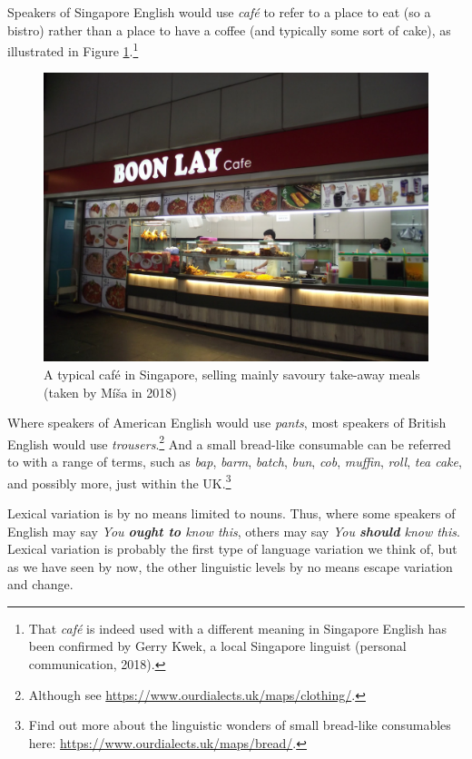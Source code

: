 Speakers of Singapore English would use \emph{café} to refer to a place to eat (so a bistro) rather than a place to have a coffee (and typically some sort of cake), as illustrated in Figure \ref{fig:boonlaycafe}.\footnote{That \emph{café} is indeed used with a different meaning in Singapore English has been confirmed by Gerry Kwek, a local Singapore linguist (personal communication, 2018).}

\begin{figure}[H]
    \centering
    \includegraphics[scale=0.2]{chapters/img/boonlaycafe.png}
    \caption{A typical café in Singapore, selling mainly savoury take-away meals (taken by Míša in 2018)}
    \label{fig:boonlaycafe}
\end{figure}

\noindent Where speakers of American English would use \emph{pants}, most speakers of British English would use \emph{trousers}.\footnote{Although see \url{https://www.ourdialects.uk/maps/clothing/}.} And a small bread-like consumable can be referred to with a range of terms, such as \emph{bap}, \emph{barm}, \emph{batch}, \emph{bun}, \emph{cob}, \emph{muffin}, \emph{roll}, \emph{tea cake}, and possibly more, just within the UK.\footnote{Find out more about the linguistic wonders of small bread-like consumables here: \url{https://www.ourdialects.uk/maps/bread/}.}

Lexical variation is by no means limited to nouns. Thus, where some speakers of English may say \textit{You \textbf{ought to} know this}, others may say \textit{You \textbf{should} know this}. Lexical variation is probably the first type of language variation we think of, but as we have seen by now, the other linguistic levels by no means escape variation and change.

